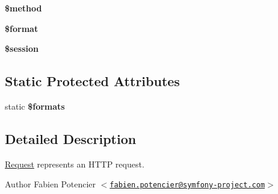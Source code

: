 \begin{DoxyCompactItemize}
\item 
\hypertarget{class_symfony_1_1_component_1_1_http_foundation_1_1_request_a12661b2fc0f57f97e30a1620889ce9c6}{
{\bfseries \$method}}
\label{class_symfony_1_1_component_1_1_http_foundation_1_1_request_a12661b2fc0f57f97e30a1620889ce9c6}

\item 
\hypertarget{class_symfony_1_1_component_1_1_http_foundation_1_1_request_a1e6e4ea377a908a5407c435e9054e3a9}{
{\bfseries \$format}}
\label{class_symfony_1_1_component_1_1_http_foundation_1_1_request_a1e6e4ea377a908a5407c435e9054e3a9}

\item 
\hypertarget{class_symfony_1_1_component_1_1_http_foundation_1_1_request_abefb3c26429d514777313e9a63d7cbac}{
{\bfseries \$session}}
\label{class_symfony_1_1_component_1_1_http_foundation_1_1_request_abefb3c26429d514777313e9a63d7cbac}

\end{DoxyCompactItemize}
\subsection*{\-Static \-Protected \-Attributes}
\begin{DoxyCompactItemize}
\item 
\hypertarget{class_symfony_1_1_component_1_1_http_foundation_1_1_request_a22ecbd1b21f5e762994cdd8899058361}{
static {\bfseries \$formats}}
\label{class_symfony_1_1_component_1_1_http_foundation_1_1_request_a22ecbd1b21f5e762994cdd8899058361}

\end{DoxyCompactItemize}


\subsection{\-Detailed \-Description}
\hyperlink{class_symfony_1_1_component_1_1_http_foundation_1_1_request}{\-Request} represents an \-H\-T\-T\-P request.

\begin{DoxyAuthor}{\-Author}
\-Fabien \-Potencier $<$\href{mailto:fabien.potencier@symfony-project.com}{\tt fabien.\-potencier@symfony-\/project.\-com}$>$ 
\end{DoxyAuthor}


